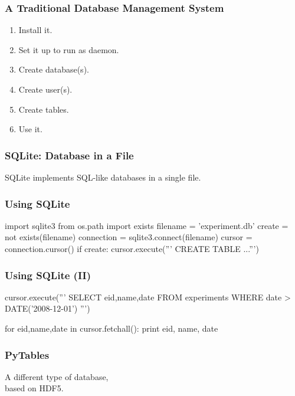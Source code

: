 \begin{frame}[fragile]
\frametitle{A Traditional Database Management System}

\begin{enumerate}
\item Install it.
\item Set it up to run as daemon.
\item Create database(s).
\item Create user(s).
\item Create tables.
\item Use it.
\end{enumerate}
\end{frame}

\begin{frame}[fragile]
\frametitle{SQLite: Database in a File}

SQLite implements SQL-like databases in a single file.
\end{frame}

\begin{frame}[fragile]
\frametitle{Using SQLite}

\begin{python}
import sqlite3
from os.path import exists
filename = 'experiment.db'
create = not exists(filename)
connection = sqlite3.connect(filename)
cursor = connection.cursor()
if create:
    cursor.execute('''
        CREATE TABLE ...''')
\end{python}
\end{frame}

\begin{frame}[fragile]
\frametitle{Using SQLite (II)}

cursor.execute('''
    SELECT eid,name,date
    FROM experiments
    WHERE date > DATE('2008-12-01')
    ''')

for eid,name,date in cursor.fetchall():
    print eid, name, date
\end{frame}

\begin{frame}[fragile]
\frametitle{PyTables}
A different type of database,\\
based on \alert{HDF5}.
\end{frame}



